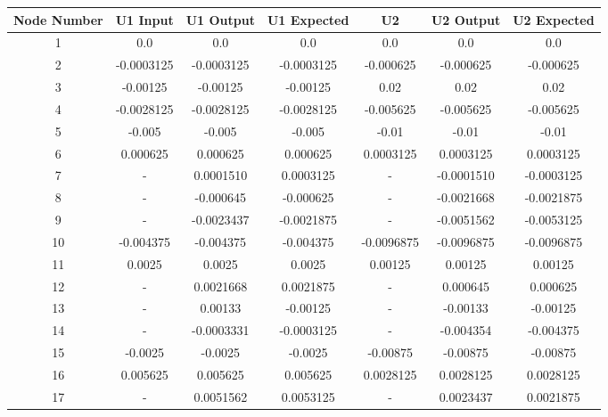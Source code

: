 \documentclass[12pt]{article}
\begin{document}
\begin{table}[H]

		\begin{tabular}{||c c c c c c c||} 
			\hline
			Node Number & U1 Input& U1 Output  & U1 Expected & U2 & U2 Output & U2 Expected\\ [0.8ex] 
			\hline\hline
			1 & 0.0 & 0.0 & 0.0 & 0.0 & 0.0 & 0.0  \\ 
			[0.8ex]
			\hline
			2 & -0.0003125 & -0.0003125 & -0.0003125 & -0.000625 & -0.000625 & -0.000625  \\ 
			[0.8ex]
			\hline
			3 & -0.00125 & -0.00125 & -0.00125 & 0.02 & 0.02 & 0.02  \\ 
			[0.8ex]
			\hline
			4 & -0.0028125 & -0.0028125 & -0.0028125 & -0.005625 & -0.005625 & -0.005625  \\ 
			[0.8ex]
			\hline
			5 & -0.005 & -0.005 & -0.005 & -0.01 & -0.01 & -0.01 \\ 
			[0.8ex]
			\hline
			6 & 0.000625 & 0.000625 & 0.000625 & 0.0003125 & 0.0003125 & 0.0003125 \\ 
			[0.8ex]
			\hline
			\rowcolor{lightgray} 7 & - & 0.0001510 & 0.0003125 & - & -0.0001510 & -0.0003125 \\ 
			[0.8ex]
			\hline
			\rowcolor{lightgray} 8 & - & -0.000645 & -0.000625 & - & -0.0021668 & -0.0021875 \\ 
			[0.8ex]
			\hline	
			\rowcolor{lightgray} 9 & - & -0.0023437 & -0.0021875 & - & -0.0051562 & -0.0053125  \\ 
			[0.8ex]
			\hline
			10 & -0.004375 & -0.004375 & -0.004375 & -0.0096875 & -0.0096875 & -0.0096875  \\ 
			[0.8ex]
			\hline
			11 & 0.0025 & 0.0025 & 0.0025 & 0.00125 & 0.00125 & 0.00125  \\ 
			[0.8ex]
			\hline
			\rowcolor{lightgray} 12 & - & 0.0021668 & 0.0021875 & - & 0.000645 & 0.000625  \\ 
			[0.8ex]
			\hline
			\rowcolor{lightgray} 13 & - & 0.00133 & -0.00125 & - & -0.00133 & -0.00125  \\ 
			[0.8ex]
			\hline
			\rowcolor{lightgray} 14 & - & -0.0003331 & -0.0003125 & - & -0.004354 & -0.004375 \\ 
			[0.8ex]
			\hline
			15 & -0.0025 & -0.0025 & -0.0025 & -0.00875 & -0.00875 & -0.00875 \\ 
			[0.8ex]	
			\hline
			16 & 0.005625 & 0.005625 & 0.005625 & 0.0028125 & 0.0028125 & 0.0028125 \\ 
			[0.8ex]
			\hline	
			\rowcolor{lightgray} 17 & - & 0.0051562 & 0.0053125 & - & 0.0023437 & 0.0021875  \\ 
			[0.8ex]
			\hline 
			

\end{tabular}
\end{table}
\end{document}

